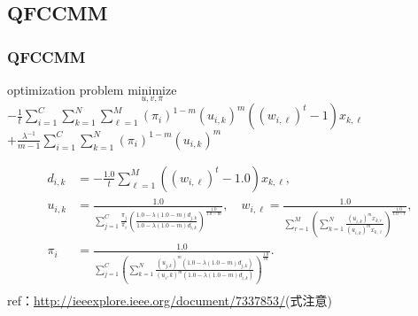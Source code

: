 \documentclass[fleqn,dvipdfmx,10pt]{beamer}
\begin{document}
\subsection{QFCCMM}
\begin{frame}\frametitle{QFCCMM}
  \begin{block}{optimization problem}
    $\underset{u,v,\pi}{\text{minimize}}$
    $-\frac{1}{t}\sum_{i=1}^C\sum_{k=1}^N\sum_{\ell=1}^M(\pi_i)^{1-m}(u_{i,k})^m((w_{i,\ell})^t-1)x_{k,\ell}$\\
    $+\frac{\lambda^{-1}}{m-1}\sum_{i=1}^C\sum_{k=1}^N (\pi_i)^{1-m}(u_{i,k})^m$\centering\\
  \end{block}
  \begin{align*}
    d_{i,k}&=-\frac{1.0}{t}\sum_{\ell=1}^M\left((w_{i,\ell})^{t}-1.0\right)x_{k,\ell},\\
    u_{i,k}&=\frac{1.0}{\sum_{j=1}^C\frac{\pi_{j}}{\pi_{i}}\left(\frac{1.0-\lambda(1.0-m)d_{j,k}}{1.0-\lambda(1.0-m)d_{i,k}}\right)^{\frac{1.0}{1.0-m}}},\quad
    w_{i,\ell}=\frac{1.0}{\sum_{r=1}^M\left(\sum_{k=1}^N\frac{(u_{i,k})^m x_{k,r}}{(u_{i,k})^m x_{k,\ell}}\right)^{\frac{1.0}{1.0-t}}},\\
    \pi_{i}&=\frac{1.0}{\sum_{j=1}^C\left(\sum_{k=1}^N\frac{(u_{j,k})^m(1.0-\lambda(1.0-m)d_{j,k})}{(u_i,k)^m(1.0-\lambda(1.0-m)d_{i,k})}\right)^{\frac{1.0}{m}}}.\\
  \end{align*}
  ref：\url{http://ieeexplore.ieee.org/document/7337853/}(式注意)\centering
\end{frame}
\end{document}
